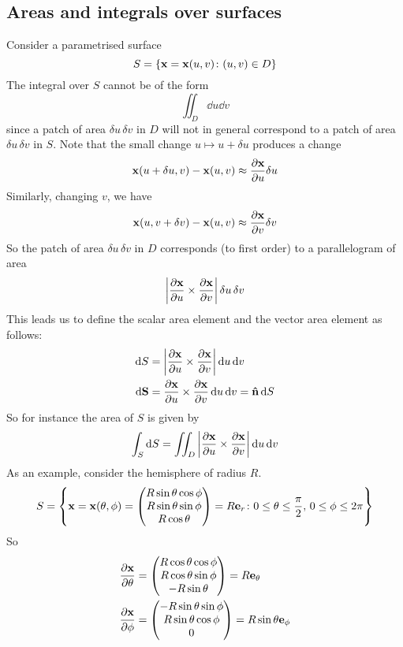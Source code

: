 \subsection{Areas and integrals over surfaces}
Consider a parametrised surface
\[
	S = \{ \vb x = \vb x(u, v) \colon (u, v) \in D \}
\]
The integral over \(S\) cannot be of the form
\[
	\iint_D \dd{u}\dd{v}
\]
since a patch of area \(\delta u \,\delta v\) in \(D\) will not in general correspond to a patch of area \(\delta u \,\delta v\) in \(S\).
Note that the small change \(u \mapsto u + \delta u\) produces a change
\[
	\vb x(u + \delta u, v) - \vb x(u, v) \approx \frac{\partial \vb x}{\partial u} \delta u
\]
Similarly, changing \(v\), we have
\[
	\vb x(u, v + \delta v) - \vb x(u, v) \approx \frac{\partial \vb x}{\partial v} \delta v
\]
So the patch of area \(\delta u\,\delta v\) in \(D\) corresponds (to first order) to a parallelogram of area
\[
	\abs{\frac{\partial \vb x}{\partial u} \times \frac{\partial \vb x}{\partial v}} \,\delta u\,\delta v
\]
This leads us to define the scalar area element and the vector area element as follows:
\begin{align*}
	\dd{S}    & = \abs{\frac{\partial \vb x}{\partial u} \times \frac{\partial \vb x}{\partial v}}\dd{u}\dd{v}          \\
	\dd \vb S & = \frac{\partial \vb x}{\partial u} \times \frac{\partial \vb x}{\partial v}\dd{u}\dd{v} = \vu{n} \dd{S}
\end{align*}
So for instance the area of \(S\) is given by
\[
	\int_S \dd{S} = \iint_D \abs{\frac{\partial \vb x}{\partial u} \times \frac{\partial \vb x}{\partial v}}\dd{u}\dd{v}
\]
As an example, consider the hemisphere of radius \(R\).
\[
	S = \left\{ \vb x = \vb x(\theta, \phi) = \begin{pmatrix}
		R\sin\theta \cos\phi \\ R\sin\theta \sin\phi \\ R\cos\theta
	\end{pmatrix} = R \vb e_r \colon 0 \leq \theta \leq \frac{\pi}{2},\, 0 \leq \phi \leq 2\pi \right\}
\]
So
\begin{align*}
	\frac{\partial \vb x}{\partial \theta} & = \begin{pmatrix}
		                                           R\cos\theta \cos\phi \\ R\cos\theta \sin\phi \\ -R\sin\theta
	                                           \end{pmatrix} = R\vb e_\theta \\
	\frac{\partial \vb x}{\partial \phi}   & = \begin{pmatrix}
		                                           -R\sin\theta \sin\phi \\ R\sin\theta \cos\phi \\ 0
	                                           \end{pmatrix} = R\sin\theta\vb e_\phi           \\
\end{align*}
